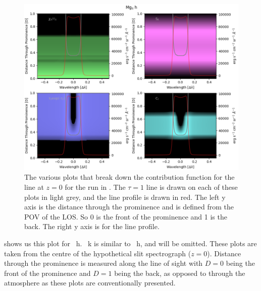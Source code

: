 \begin{figure}
    \centering
    \includegraphics[width=0.9\linewidth]{./03Modelling2D/figs/matplots/mghv0.png}
    \caption[The various plots that break down the contribution function.]{The various plots that break down the contribution function for the line at $z=0$ for the run in . The $\tau=1$ line is drawn on each of these plots in light grey, and the line profile is drawn in red. The left y axis is the distance through the prominence and is defined from the POV of the LOS. So 0 is the front of the prominence and 1 is the back. The right y axis is for the line profile.}
    \label{v0}
\end{figure}
 shows us this plot for \mgii~h. \mgii~k is similar to \mgii~h, and will be omitted. These plots are taken from the centre of the hypothetical slit spectrograph ($z=0$). Distance through the prominence is measured along the line of sight with $D=0$ being the front of the prominence and $D=1$ being the back, as opposed to through the atmosphere as these plots are conventionally presented.
